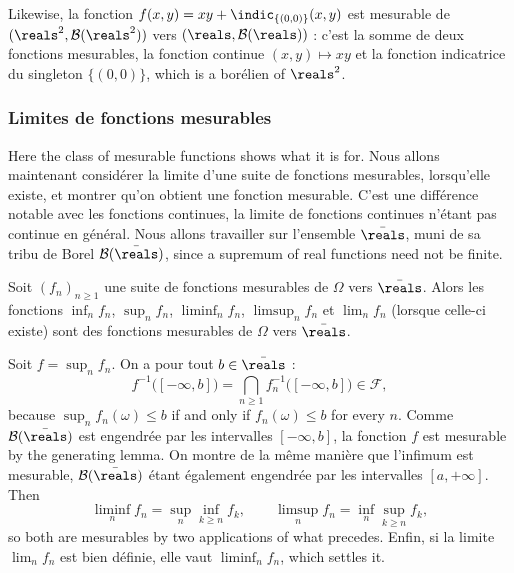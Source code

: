 \begin{example}
  Likewise, la fonction $f(x,y) = xy + \indic_{\{(0,0)\}}(x,y)$ est mesurable de
  $(\reals^{2},\mathcal{B}(\reals^{2}))$ vers $(\reals,\mathcal{B}(\reals))$ : c'est
  la somme de deux fonctions mesurables, la fonction continue $(x,y) \mapsto xy$ et
  la fonction indicatrice du singleton $\{(0,0)\}$, which is a borélien of
  $\reals^{2}$.
\end{example}

\subsubsection{Limites de fonctions mesurables}

Here the class of mesurable functions shows what it is for. Nous allons maintenant
considérer la limite d'une suite de fonctions mesurables, lorsqu'elle existe, et
montrer qu'on obtient une fonction mesurable. C'est une différence notable avec les
fonctions continues, la limite de fonctions continues n'étant pas continue en
général. Nous allons travailler sur l'ensemble $\bar{\reals}$, muni de sa tribu de
Borel $\mathcal{B}(\bar{\reals})$, since a supremum of real functions need not be
finite.

\begin{prop}
  Soit $(f_{n})_{n \geq 1}$ une suite de fonctions mesurables de $\Omega$ vers
  $\bar{\reals}$. Alors les fonctions $\inf_{n} f_{n}$, $\sup_{n} f_{n}$,
  $\liminf_{n} f_{n}$, $\limsup_{n} f_{n}$ et $\lim_{n} f_{n}$ (lorsque celle-ci
  existe) sont des fonctions mesurables de $\Omega$ vers $\bar{\reals}$.
\end{prop}

\begin{remark}
  Soit $f = \sup_{n} f_{n}$. On a pour tout $b \in \bar{\reals}$ :
  \[
    f^{-1}\bigl([-\infty,b]\bigr) = \bigcap_{n \geq 1} f_{n}^{-1}
    \bigl([-\infty,b]\bigr) \in \mathcal{F},
  \]
  because $\sup_{n} f_{n}(\omega) \leq b$ if and only if $f_{n}(\omega) \leq b$ for
  every $n$. Comme $\mathcal{B}(\bar{\reals})$ est engendrée par les intervalles
  $[-\infty,b]$, la fonction $f$ est mesurable by the generating lemma. On montre de
  la même manière que l'infimum est mesurable, $\mathcal{B}(\bar{\reals})$ étant
  également engendrée par les intervalles $[a,+\infty]$. Then
  \[
    \liminf_{n} f_{n} = \sup_{n} \inf_{k \geq n} f_{k},
    \qquad
    \limsup_{n} f_{n} = \inf_{n} \sup_{k \geq n} f_{k},
  \]
  so both are mesurables by two applications of what precedes. Enfin, si la limite
  $\lim_{n} f_{n}$ est bien définie, elle vaut $\liminf_{n} f_{n}$, which settles it.
\end{remark}

